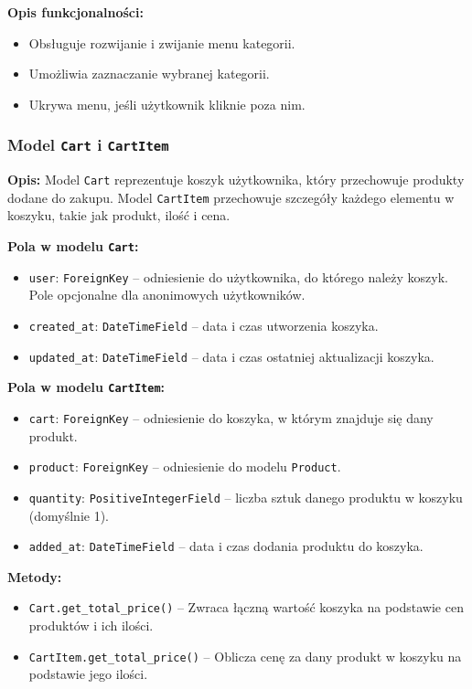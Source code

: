 \documentclass[12pt,a4paper,oneside]{article}
\theoremstyle{definition}
\numberwithin{equation}{section}
\begin{document}
\textbf{Opis funkcjonalności:}
\begin{itemize}
    \item Obsługuje rozwijanie i zwijanie menu kategorii.
    \item Umożliwia zaznaczanie wybranej kategorii.
    \item Ukrywa menu, jeśli użytkownik kliknie poza nim.
\end{itemize}


% 
% 

\subsubsection{Model \texttt{Cart} i \texttt{CartItem}}

\textbf{Opis:}  
Model \texttt{Cart} reprezentuje koszyk użytkownika, który przechowuje produkty dodane do zakupu. Model \texttt{CartItem} przechowuje szczegóły każdego elementu w koszyku, takie jak produkt, ilość i cena.

\textbf{Pola w modelu \texttt{Cart}:}
\begin{itemize}
    \item \texttt{user}: \texttt{ForeignKey} – odniesienie do użytkownika, do którego należy koszyk. Pole opcjonalne dla anonimowych użytkowników.
    \item \texttt{created\_at}: \texttt{DateTimeField} – data i czas utworzenia koszyka.
    \item \texttt{updated\_at}: \texttt{DateTimeField} – data i czas ostatniej aktualizacji koszyka.
\end{itemize}

\textbf{Pola w modelu \texttt{CartItem}:}
\begin{itemize}
    \item \texttt{cart}: \texttt{ForeignKey} – odniesienie do koszyka, w którym znajduje się dany produkt.
    \item \texttt{product}: \texttt{ForeignKey} – odniesienie do modelu \texttt{Product}.
    \item \texttt{quantity}: \texttt{PositiveIntegerField} – liczba sztuk danego produktu w koszyku (domyślnie 1).
    \item \texttt{added\_at}: \texttt{DateTimeField} – data i czas dodania produktu do koszyka.
\end{itemize}

\textbf{Metody:}
\begin{itemize}
    \item \texttt{Cart.get\_total\_price()} – Zwraca łączną wartość koszyka na podstawie cen produktów i ich ilości.
    \item \texttt{CartItem.get\_total\_price()} – Oblicza cenę za dany produkt w koszyku na podstawie jego ilości.
\end{itemize}
\end{document}

